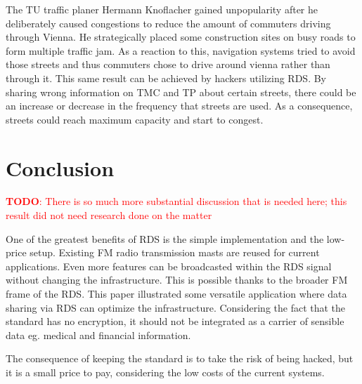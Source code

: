 \documentclass[conference,12pt,a4paper]{IEEEtran}
\newcommand{\todo}[1]{\textcolor{red}{\textbf{TODO}: #1}}
\begin{document}
	The TU traffic planer Hermann Knoflacher gained unpopularity after he deliberately caused congestions to reduce the amount of commuters driving through Vienna.
	He strategically placed some construction sites on busy roads to form multiple traffic jam\cite{presse}. As a reaction to this, navigation systems tried to avoid those streets and thus commuters chose to drive around vienna rather than through it. This same result can be achieved by hackers utilizing RDS. By sharing wrong information on TMC and TP about certain streets, there could be an increase or decrease in the frequency that streets are used. As a consequence, streets could reach maximum capacity and start to congest.\\
	
	
	\section {Conclusion}
	\todo{There is so much more substantial discussion that is needed here; this result did not need research done on the matter}
	
	One of the greatest benefits of RDS is the simple implementation and the low-price setup. Existing FM radio transmission masts are reused for current applications. Even more features can be broadcasted within the RDS signal without changing the infrastructure. This is possible thanks to the broader FM frame of the RDS. This paper illustrated some versatile application where data sharing via RDS can optimize the infrastructure. Considering the fact that the standard has no encryption, it should not be integrated as a carrier of sensible data eg. medical and financial information. 
	
	The consequence of keeping the standard is to take the risk of being hacked, but it is a small price to pay, considering the low costs of the current systems. 
	
	
	
	
\end{document}

